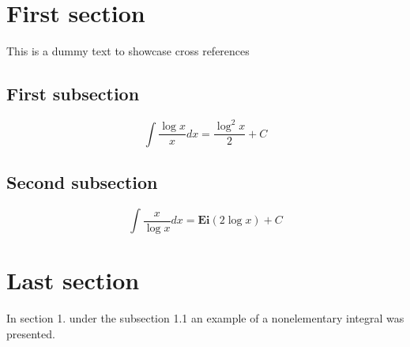 \documentclass{article}
\begin{document}
\section{First section}
This is a dummy text to showcase cross references

\subsection{First subsection}
\[\int\frac{\log{x}}{x}dx=\frac{\log^2{x}}{2} + C\]

\subsection{Second subsection}
\[\int\frac{x}{\log{x}}dx=\mathbf{Ei}(2\log{x})+C\]

\section{Last section}
In section 1. under the subsection
1.1 an example of a nonelementary
integral was presented.
\end{document}
